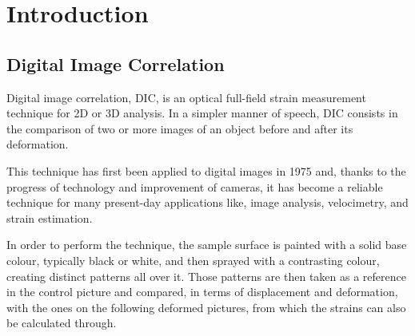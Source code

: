 

\chapter{Introduction}
\label{cha:introduction}


\section{Digital Image Correlation} 
\label{sub:dic}






\indent \indent Digital image correlation, DIC, is an optical full-field strain measurement technique for 2D or 3D analysis. In a simpler manner of speech, DIC consists in the comparison of two or more images of an object before and after its deformation.

This technique has first been applied to digital images in 1975 and, thanks to the progress of technology and improvement of cameras, it has become a reliable technique for many present-day applications like, image analysis, velocimetry, and strain estimation.

In order to perform the technique, the sample surface is painted with a solid base colour, typically black or white, and then sprayed with a contrasting colour, creating distinct patterns all over it. Those patterns are then taken as a reference in the control picture and compared, in terms of displacement and deformation, with the ones on the following deformed pictures, from which the strains can also be calculated through.

